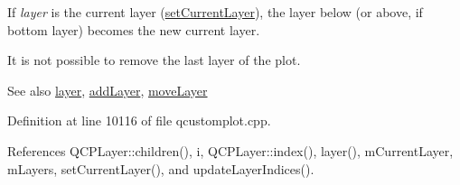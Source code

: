 If {\itshape layer} is the current layer (\hyperlink{class_q_custom_plot_a73a6dc47c653bb6f8f030abca5a11852}{set\+Current\+Layer}), the layer below (or above, if bottom layer) becomes the new current layer.

It is not possible to remove the last layer of the plot.

\begin{DoxySeeAlso}{See also}
\hyperlink{class_q_custom_plot_aac492da01782820454e9136a8db28182}{layer}, \hyperlink{class_q_custom_plot_ad5255393df078448bb6ac83fa5db5f52}{add\+Layer}, \hyperlink{class_q_custom_plot_ae896140beff19424e9e9e02d6e331104}{move\+Layer} 
\end{DoxySeeAlso}


Definition at line 10116 of file qcustomplot.\+cpp.



References Q\+C\+P\+Layer\+::children(), i, Q\+C\+P\+Layer\+::index(), layer(), m\+Current\+Layer, m\+Layers, set\+Current\+Layer(), and update\+Layer\+Indices().


